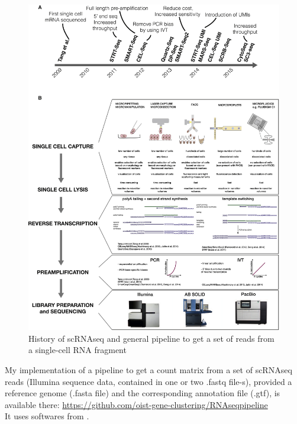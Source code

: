 \documentclass{report}
\begin{document}
\begin{figure}[H]
\centering
\includegraphics[scale=1]{illustrations/scrnaseq.jpg}
\caption{History of scRNAseq and general pipeline to get a set of reads from a single-cell RNA fragment}
\label{historyseq}
\end{figure}

My implementation of a pipeline to get a count matrix from a set of scRNAseq reads (Illumina sequence data, contained in one or two .fastq file-s), provided a reference genome (.fasta file) and the corresponding annotation file (.gtf), is available there: {\url{https://github.com/oist-gene-clustering/RNAseqpipeline}}\\

It uses softwares from \cite{andrews2010fastqc}\cite{bolger2014trimmomatic}\cite{langmead2012fast}\cite{li2009sequence}\cite{pertea2015stringtie}\cite{jiang2016quality}\cite{katayama2013samstrt}\cite{trapnell2012differential}.
\end{document}
